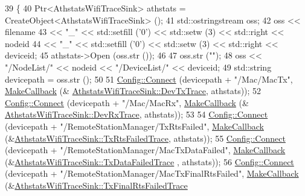 \begin{DoxyCode}
39 \{
40   Ptr<AthstatsWifiTraceSink> athstats = CreateObject<AthstatsWifiTraceSink> ();
41   std::ostringstream oss;
42   oss << filename
43       << \textcolor{stringliteral}{"\_"} << std::setfill (\textcolor{charliteral}{'0'}) << std::setw (3) << std::right <<  nodeid
44       << \textcolor{stringliteral}{"\_"} << std::setfill (\textcolor{charliteral}{'0'}) << std::setw (3) << std::right << deviceid;
45   athstats->Open (oss.str ());
46 
47   oss.str (\textcolor{stringliteral}{""});
48   oss << \textcolor{stringliteral}{"/NodeList/"} << nodeid << \textcolor{stringliteral}{"/DeviceList/"} << deviceid;
49   std::string devicepath = oss.str ();
50 
51   \hyperlink{group__config_ga4014f151241cd0939b6cb64409605736}{Config::Connect} (devicepath + \textcolor{stringliteral}{"/Mac/MacTx"}, \hyperlink{group__makecallbackmemptr_ga9376283685aa99d204048d6a4b7610a4}{MakeCallback} (&
      \hyperlink{classns3_1_1AthstatsWifiTraceSink_a819944bc5c793fb4f8b0a50f9bcc9ad9}{AthstatsWifiTraceSink::DevTxTrace}, athstats));
52   \hyperlink{group__config_ga4014f151241cd0939b6cb64409605736}{Config::Connect} (devicepath + \textcolor{stringliteral}{"/Mac/MacRx"}, \hyperlink{group__makecallbackmemptr_ga9376283685aa99d204048d6a4b7610a4}{MakeCallback} (&
      \hyperlink{classns3_1_1AthstatsWifiTraceSink_a3caa61a03112c38a690562a97eff88e0}{AthstatsWifiTraceSink::DevRxTrace}, athstats));
53 
54   \hyperlink{group__config_ga4014f151241cd0939b6cb64409605736}{Config::Connect} (devicepath + \textcolor{stringliteral}{"/RemoteStationManager/TxRtsFailed"}, 
      \hyperlink{group__makecallbackmemptr_ga9376283685aa99d204048d6a4b7610a4}{MakeCallback} (&\hyperlink{classns3_1_1AthstatsWifiTraceSink_a676a029bed40984ff0e03b1ff60528a6}{AthstatsWifiTraceSink::TxRtsFailedTrace}, 
      athstats));
55   \hyperlink{group__config_ga4014f151241cd0939b6cb64409605736}{Config::Connect} (devicepath + \textcolor{stringliteral}{"/RemoteStationManager/MacTxDataFailed"}, 
      \hyperlink{group__makecallbackmemptr_ga9376283685aa99d204048d6a4b7610a4}{MakeCallback} (&\hyperlink{classns3_1_1AthstatsWifiTraceSink_abc308a4d8b65afc5775cf4001515909c}{AthstatsWifiTraceSink::TxDataFailedTrace}
      , athstats));
56   \hyperlink{group__config_ga4014f151241cd0939b6cb64409605736}{Config::Connect} (devicepath + \textcolor{stringliteral}{"/RemoteStationManager/MacTxFinalRtsFailed"}, 
      \hyperlink{group__makecallbackmemptr_ga9376283685aa99d204048d6a4b7610a4}{MakeCallback} (&\hyperlink{classns3_1_1AthstatsWifiTraceSink_a029bc1c199f7331467a57d3e304e0981}{AthstatsWifiTraceSink::TxFinalRtsFailedTrace}

\end{DoxyCode}
